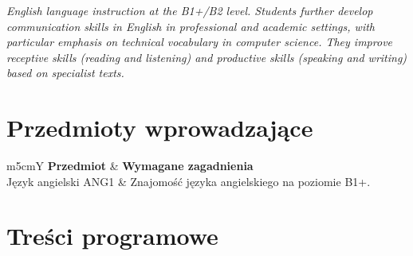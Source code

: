 \documentclass[12pt, a4paper]{article}
\newcommand{\thdrule}{\noalign{\global\setlength{\extrarowheight}{0pt}}}
\newcommand{\thdend}{\noalign{\global\setlength{\extrarowheight}{3pt}}}
\begin{document}
\textit{English language instruction at the B1+/B2 level. Students further develop communication skills in English in professional and academic settings, with particular emphasis on technical vocabulary in computer science. They improve receptive skills (reading and listening) and productive skills (speaking and writing) based on specialist texts.}


\section{Przedmioty wprowadzające}

{\scriptsize
\begin{tabularx}{\textwidth}{m{5cm}Y}
\thdrule\toprule
{} {\color{white}\textbf{Przedmiot}} & {\color{white}\textbf{Wymagane zagadnienia}} \\
\midrule\thdend
   Język angielski ANG1 & Znajomość języka angielskiego na poziomie B1+. \\
\bottomrule
\end{tabularx}}

\section{Treści programowe}
\end{document}
